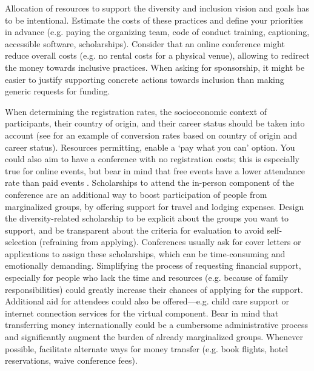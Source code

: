 \documentclass[10pt,letterpaper]{article}
\begin{document}
Allocation of resources to support the diversity and inclusion vision and goals has to be intentional. 
Estimate the costs of these practices and define your priorities in advance (e.g. paying the organizing team, code of conduct training, captioning, accessible software, scholarships).
Consider that an online conference might reduce overall costs (e.g. no rental costs for a physical venue), allowing to redirect the money towards inclusive practices. 
When asking for sponsorship, it might be easier to justify supporting concrete actions towards inclusion than making generic requests for funding.

When determining the registration rates, the socioeconomic context of participants, their country of origin, and their career status should be taken into account  \cite{sarabipourChangingScientificMeetings2021, andalibPostdocQueueLabour2018, kaplanPostdocNot2012}
(see \cite{canelon2021cost} for an example of conversion rates based on country of origin and career status). 
Resources permitting, enable a `pay what you can' option. You could also aim to have a conference with no registration costs; this is especially true for online events, but bear in mind that free events have a lower attendance rate than paid events \cite{eventbrite_ultimate_2017}. 
Scholarships to attend the in-person component of the conference are an additional way to boost participation of people from marginalized groups, by offering support for travel and lodging expenses.
Design the diversity-related scholarship to be explicit about the groups you want to support, and be transparent about the criteria for evaluation to avoid self-selection (refraining from applying). 
Conferences usually ask for cover letters or applications to assign these scholarships, which can be time-consuming and emotionally demanding. 
Simplifying the process of requesting financial support, especially for 
people who lack the time and resources (e.g. because of family responsibilities) could greatly increase their chances of applying for the support. 
Additional aid for attendees could also be offered—e.g. child care support or internet connection services for the virtual component. 
Bear in mind that transferring money internationally could be a cumbersome administrative process and significantly augment the burden of already marginalized groups. Whenever possible, facilitate alternate ways for money transfer (e.g. book flights, hotel reservations, waive conference fees).
\end{document}
